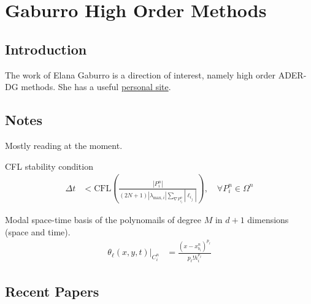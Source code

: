 \section{Gaburro High Order Methods}

\subsection{Introduction}

The work of Elana Gaburro is a direction of interest, namely high order ADER-DG methods.
She has a useful \href{https://www.elenagaburro.it/}{personal site}.

\subsection{Notes}

Mostly reading \cite{Gaburro2020High} at the moment.

CFL stability condition
\begin{align}
  \Delta t &< \text{CFL}\left(
    \frac{|P_i^n|}{(2N + 1) | \lambda_{\text{max},i}| \sum_{\nabla P_{i_j}^n} |\ell_{i_j}|}
  \right), \quad \forall P^{n}_i \in \Omega^n
\end{align}

Modal space-time basis of the polynomails of degree $M$ in $d + 1$ dimensions (space and time).
\begin{align}
  \theta_{\ell}(x, y, t)|_{C^n_i} &= 
  \frac{(x - x^n_{b_i})^{p_{\ell}}}{p_{\ell}!h_i^{p_{\ell}}}
\end{align}

\subsection{Recent Papers}

